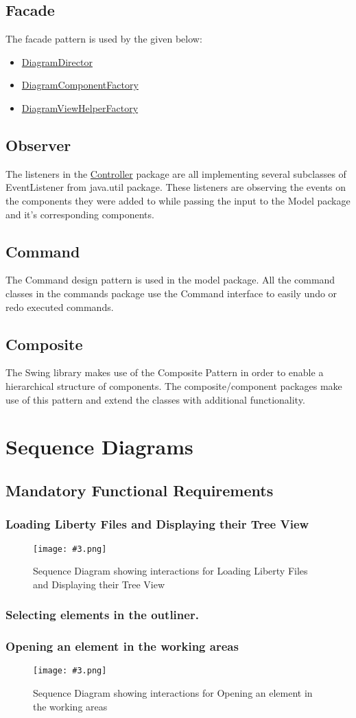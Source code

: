 \documentclass[10pt,a4paper]{report}
\newcommand{\refer}[2]{\hyperref[#1]{\textcolor{col:reference}{#2}}}
\newcommand{\includeimage}[5]{
    \begin{figure}[H]
        #1
        \texttt{[image: \#3.png]}
        \caption{#4}
        \label{fig:#5}
    \end{figure}
}
\newcommand{\type}[1]{\textcolor{col:class}{#1}}
\newcommand{\packagebeginning}{edu.kit.informatik.pse.gelf} %
\newcommand{\lblroot}{lbl} %
\newcommand{\lblpackage}{} %
\newcommand{\lblpackageelement}{} %
\newcommand{\lblpackageelementmember}{} %
\newcommand{\lblpackageelementmemberparameter}{} %
\newcommand{\casclabelname}{\lblroot\lblpackage\lblpackageelement\lblpackageelementmember\lblpackageelementmemberparameter}
\newcommand{\casclabel}{\label{\casclabelname}}
\newcommand{\patternentry}[2]{
    #1{#2}
}
\newcommand{\pattern}[2]{
    \patternentry{\section}{#1}
    {#2}
}
\begin{document}
\pattern{Facade}{
    The facade pattern is used by the given below:
    \leavevmode \\
    \begin{itemize}
        \item \refer{\lblroot:view.diagrams:DiagramDirector}{DiagramDirector}
        \item \refer{\lblroot:view.diagrams.components:DiagramComponentFactory}{DiagramComponentFactory}
        \item \refer{\lblroot:view.diagrams.indicator:DiagramViewHelperFactory}{DiagramViewHelperFactory}
    \end{itemize}
}
\pattern{Observer}{The listeners in the \refer{\lblroot:controller.listeners}{Controller} package are all implementing several subclasses of \type{EventListener} from java.util package. These listeners are observing the events on the components they were added to while passing the input to the Model package and it's corresponding components.}
\pattern{Command}
{The Command design pattern is used in the model package.\newline
All the command classes in the commands package use the Command interface to easily undo or redo executed commands.}
\pattern{Composite}{
    The Swing library makes use of the Composite Pattern in order to enable a hierarchical structure of components. The composite/component packages make use of this pattern and extend the classes with additional functionality.
}

\chapter{Sequence Diagrams}
\section{Mandatory Functional Requirements}
\subsection{Loading Liberty Files and Displaying their Tree View}
\includeimage{}{0.23}{FR1-2}{Sequence Diagram showing interactions for Loading Liberty Files and Displaying their Tree View}{FR-1 and FR-2}
\subsection{Selecting elements in the outliner.}
\subsection{Opening an element in the working areas}
\includeimage{}{0.25}{FR-4}{Sequence Diagram showing interactions for Opening an element in the working areas}{FR-4}
\end{document}

